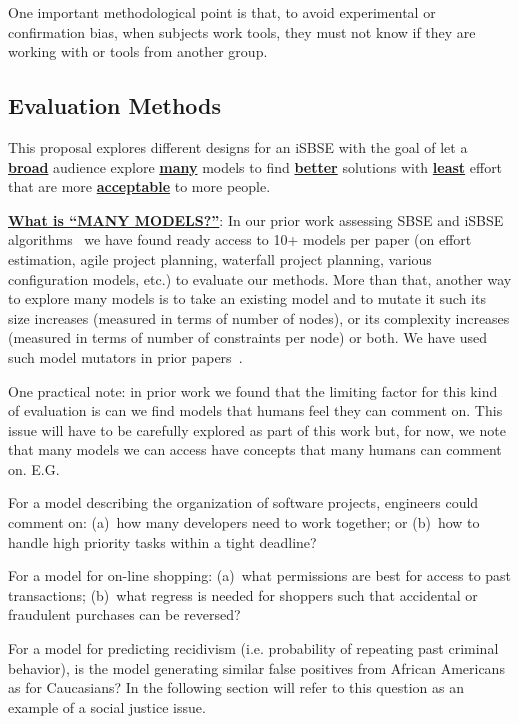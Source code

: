 One important methodological point   is that, to avoid experimental
or confirmation bias, when   subjects work    tools, they must not know if they are working with
{\ITTT} or tools from another   group. 


 
  
  
 

 \subsection{ Evaluation Methods }
This proposal explores different designs for an iSBSE with the goal of let a \underline{\bf broad}
audience explore \underline{\bf many} 
models to find \underline{\bf better} solutions
with \underline{\bf least} effort that are more \underline{\bf acceptable} to   more people.  


 \underline{\bf What is ``MANY MODELS?''}: 
 In our prior work assessing SBSE and iSBSE algorithms~\cite{lustosa21,lustosa22,nair18,Nair2016,jchen19}
 we have found ready access to  10+ models per paper (on effort estimation, agile project planning,
 waterfall project planning, various configuration models, etc.) to evaluate our methods.
    More than that, another way to explore many models is to take an existing model
    and to mutate it such its size increases (measured in terms of number of nodes), 
    or its complexity increases (measured in terms of number of constraints per node)
    or both. We have used such model mutators in prior papers~\cite{lustosa21}.
    
One practical note: in prior work we found that the limiting factor for this kind
of evaluation is can we find models that humans feel they can comment on. This
issue will have to be carefully explored as part of this work but, for now, we note
that many   models we can access have concepts that many humans   can comment on. E.G.
\bi
\item For a model describing the organization of software projects,
engineers could comment on:  (a)~how many developers need to work together; or
(b)~how to handle high priority tasks within a tight deadline?
\item For a model for on-line shopping:  (a)~what permissions are best for access to past transactions;
(b)~what regress is needed for shoppers such that accidental or fraudulent purchases can be reversed?
\item For a model for predicting recidivism (i.e. probability of repeating  past criminal behavior),
is the model generating similar false positives from African Americans as for Caucasians?
\ei
In the following section will refer to this     question as an example
of    a social justice issue.

